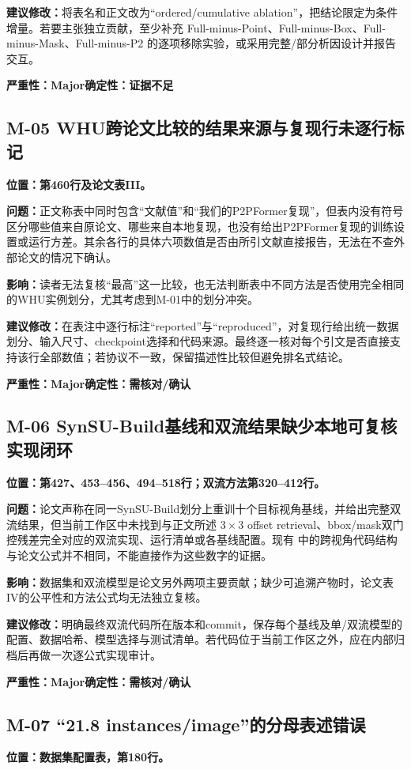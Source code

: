 \documentclass[UTF8,a4paper,11pt]{ctexart}
\newcommand{\sev}[1]{\textbf{严重性：#1}}
\newcommand{\cert}[1]{\textbf{确定性：#1}}
\newcommand{\loc}[1]{\textbf{位置：#1}}
\newcommand{\prob}{\textbf{问题：}}
\newcommand{\impact}{\textbf{影响：}}
\newcommand{\fix}{\textbf{建议修改：}}
\begin{document}
\fix 将表名和正文改为“ordered/cumulative ablation”，把结论限定为条件增量。若要主张独立贡献，至少补充 Full-minus-Point、Full-minus-Box、Full-minus-Mask、Full-minus-P2 的逐项移除实验，或采用完整/部分析因设计并报告交互。

\sev{Major}\quad \cert{证据不足}

\subsection*{M-05 WHU跨论文比较的结果来源与复现行未逐行标记}
\loc{第460行及论文表III。}

\prob 正文称表中同时包含“文献值”和“我们的P2PFormer复现”，但表内没有符号区分哪些值来自原论文、哪些来自本地复现，也没有给出P2PFormer复现的训练设置或运行方差。其余各行的具体六项数值是否由所引文献直接报告，无法在不查外部论文的情况下确认。

\impact 读者无法复核“最高”这一比较，也无法判断表中不同方法是否使用完全相同的WHU实例划分，尤其考虑到M-01中的划分冲突。

\fix 在表注中逐行标注“reported”与“reproduced”，对复现行给出统一数据划分、输入尺寸、checkpoint选择和代码来源。最终逐一核对每个引文是否直接支持该行全部数值；若协议不一致，保留描述性比较但避免排名式结论。

\sev{Major}\quad \cert{需核对/确认}

\subsection*{M-06 SynSU-Build基线和双流结果缺少本地可复核实现闭环}
\loc{第427、453--456、494--518行；双流方法第320--412行。}

\prob 论文声称在同一SynSU-Build划分上重训十个目标视角基线，并给出完整双流结果，但当前工作区中未找到与正文所述 $3\times3$ offset retrieval、bbox/mask双门控残差完全对应的双流实现、运行清单或各基线配置。现有  中的跨视角代码结构与论文公式并不相同，不能直接作为这些数字的证据。

\impact 数据集和双流模型是论文另外两项主要贡献；缺少可追溯产物时，论文表IV的公平性和方法公式均无法独立复核。

\fix 明确最终双流代码所在版本和commit，保存每个基线及单/双流模型的配置、数据哈希、模型选择与测试清单。若代码位于当前工作区之外，应在内部归档后再做一次逐公式实现审计。

\sev{Major}\quad \cert{需核对/确认}

\subsection*{M-07 “21.8 instances/image”的分母表述错误}
\loc{数据集配置表，第180行。}
\end{document}
